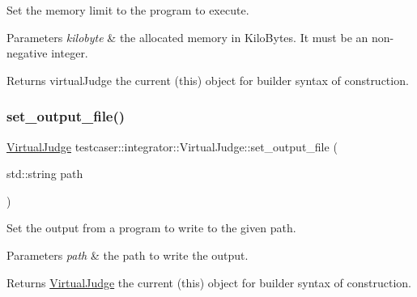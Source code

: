 Set the memory limit to the program to execute. 


\begin{DoxyParams}{Parameters}
{\em kilobyte} & the allocated memory in Kilo\+Bytes. It must be an non-\/negative integer. \\
\hline
\end{DoxyParams}
\begin{DoxyReturn}{Returns}
virtual\+Judge the current (this) object for builder syntax of construction. 
\end{DoxyReturn}
\mbox{\label{classtestcaser_1_1integrator_1_1VirtualJudge_a9f054aac69019e5f6bde646ccc72effb}} 
\subsubsection{\texorpdfstring{set\_output\_file()}{set\_output\_file()}}
{\footnotesize\ttfamily \mbox{\hyperlink{classtestcaser_1_1integrator_1_1VirtualJudge}{Virtual\+Judge}} testcaser\+::integrator\+::\+Virtual\+Judge\+::set\+\_\+output\+\_\+file (\begin{DoxyParamCaption}\item[{std\+::string}]{path }\end{DoxyParamCaption})\hspace{0.3cm}{\ttfamily [inline]}}



Set the output from a program to write to the given path. 


\begin{DoxyParams}{Parameters}
{\em path} & the path to write the output. \\
\hline
\end{DoxyParams}
\begin{DoxyReturn}{Returns}
\mbox{\hyperlink{classtestcaser_1_1integrator_1_1VirtualJudge}{Virtual\+Judge}} the current (this) object for builder syntax of construction. 
\end{DoxyReturn}
\mbox{\label{classtestcaser_1_1integrator_1_1VirtualJudge_a121272932bb115881ad90be79ad7d0a7}} 
